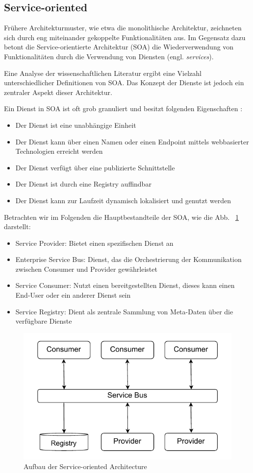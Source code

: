 \documentclass[acmtog]{acmart}
\begin{document}
\subsection{Service-oriented}
Frühere Architekturmuster, wie etwa die monolithische Architektur, zeichneten sich durch eng miteinander gekoppelte
Funktionalitäten aus. Im Gegensatz dazu betont die Service-orientierte Architektur (SOA) die Wiederverwendung
von Funktionalitäten durch die Verwendung von Diensten (engl. \textit{services}).

Eine Analyse der wissenschaftlichen Literatur ergibt eine Vielzahl unterschiedlicher Definitionen von SOA.
Das Konzept der Dienste ist jedoch ein zentraler Aspekt dieser Architektur.

Ein Dienst in SOA ist oft grob granuliert und besitzt folgenden Eigenschaften \cite[16]{soa2}\cite[19]{soa4}:
\begin{itemize}
  \item Der Dienst ist eine unabhängige Einheit
  \item Der Dienst kann über einen Namen oder einen Endpoint mittels webbasierter Technologien erreicht werden
  \item Der Dienst verfügt über eine publizierte Schnittstelle
  \item Der Dienst ist durch eine Registry auffindbar
  \item Der Dienst kann zur Laufzeit dynamisch lokalisiert und genutzt werden
\end{itemize}

Betrachten wir im Folgenden die Hauptbestandteile der SOA, wie die Abb. ~\ref{fig:soa} \cite{soa4} darstellt:
\begin{itemize}
  \item Service Provider: Bietet einen spezifischen Dienst an
  \item Enterprise Service Bus: Dienst, das die Orchestrierung der Kommunikation zwischen Consumer und Provider gewährleistet
  \item Service Consumer: Nutzt einen bereitgestellten Dienst, dieses kann einen End-User oder ein anderer Dienst sein
  \item Service Registry: Dient als zentrale Sammlung von Meta-Daten über die verfügbare Dienste
\end{itemize}

\begin{figure}[!h]
  \centering
  \includegraphics[width=0.8\linewidth]{images/soa/soa.pdf}
  \caption{Aufbau der Service-oriented Architecture}
  \label{fig:soa}
\end{figure}
\end{document}
